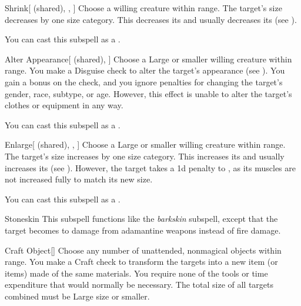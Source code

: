 \begin{ability}[\nth{2}]{Shrink}[ (shared), , ]
Choose a willing creature within \rngclose range.
The target's size decreases by one size category.
This decreases its  and usually decreases its  (see ).

You can cast this subspell as a .
\end{ability}
\vspace{0.25em}


\begin{ability}[\nth{3}]{Alter Appearance}[ (shared), ]
Choose a Large or smaller willing creature within \rngclose range.
You make a Disguise check to alter the target's appearance (see ).
You gain a  bonus on the check, and you ignore penalties for changing the target's gender, race, subtype, or age.
However, this effect is unable to alter the target's clothes or equipment in any way.

You can cast this subspell as a .
\end{ability}
\vspace{0.25em}


\begin{ability}[\nth{3}]{Enlarge}[ (shared), , ]
Choose a Large or smaller willing creature within \rngclose range.
The target's size increases by one size category.
This increases its  and usually increases its  (see ).
However, the target takes a \minus1d penalty to , as its muscles are not increased fully to match its new size.

You can cast this subspell as a .
\end{ability}
\vspace{0.25em}


\begin{ability}[\nth{3}]{Stoneskin}
This subspell functions like the \textit{barkskin} subspell, except that the target becomes  to damage from adamantine weapons instead of fire damage.
\end{ability}
\vspace{0.25em}


\begin{ability}[\nth{4}]{Craft Object}[]
Choose any number of unattended, nonmagical objects within \rngclose range.
You make a Craft check to transform the targets into a new item (or items) made of the same materials.
You require none of the tools or time expenditure that would normally be necessary.
The total size of all targets combined must be Large size or smaller.
\end{ability}
\vspace{0.25em}


